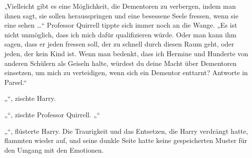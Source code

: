 „Vielleicht gibt es eine Möglichkeit, die Dementoren zu verbergen, indem man ihnen sagt, sie sollen herausspringen und eine besessene Seele fressen, wenn sie eine sehen …“
Professor Quirrell tippte sich immer noch an die Wange.
„Es ist nicht unmöglich, dass ich mich dafür qualifizieren würde. Oder man kann ihm sagen, dass er jeden fressen soll, der zu schnell durch diesen Raum geht, oder jeden, der kein Kind ist. Wenn man bedenkt, dass ich Hermine und Hunderte von anderen Schülern als Geiseln halte, würdest du deine Macht über Dementoren einsetzen, um mich zu verteidigen, wenn sich ein Dementor enttarnt? Antworte in Parsel.“

„“, zischte Harry.

„“, zischte Professor Quirrell. „“

„“, flüsterte Harry.
Die Traurigkeit und das Entsetzen, die Harry verdrängt hatte, flammten wieder auf, und seine dunkle Seite hatte keine gespeicherten Muster für den Umgang mit den Emotionen.

